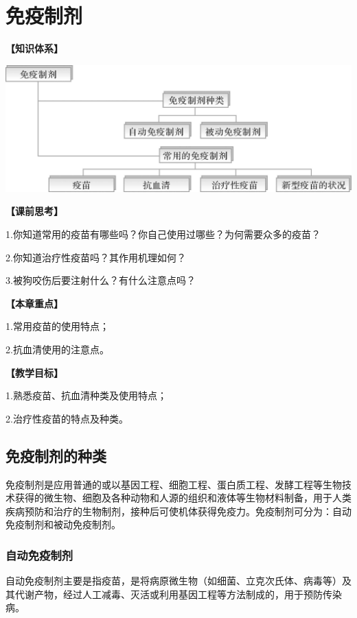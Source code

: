 \chapter{免疫制剂}

\begin{framed}
\noindent\textbf{【知识体系】}
\begin{center}
\includegraphics{./images/Image00185.jpg}
\end{center}
\noindent\textbf{【课前思考】}

1.你知道常用的疫苗有哪些吗？你自己使用过哪些？为何需要众多的疫苗？

2.你知道治疗性疫苗吗？其作用机理如何？

3.被狗咬伤后要注射什么？有什么注意点吗？

\noindent\textbf{【本章重点】}

1.常用疫苗的使用特点；

2.抗血清使用的注意点。

\noindent\textbf{【教学目标】}

1.熟悉疫苗、抗血清种类及使用特点；

2.治疗性疫苗的特点及种类。
\end{framed}

\section{免疫制剂的种类}

免疫制剂是应用普通的或以基因工程、细胞工程、蛋白质工程、发酵工程等生物技术获得的微生物、细胞及各种动物和人源的组织和液体等生物材料制备，用于人类疾病预防和治疗的生物制剂，接种后可使机体获得免疫力。免疫制剂可分为：自动免疫制剂和被动免疫制剂。


\subsection{自动免疫制剂}

自动免疫制剂主要是指疫苗，是将病原微生物（如细菌、立克次氏体、病毒等）及其代谢产物，经过人工减毒、灭活或利用基因工程等方法制成的，用于预防传染病。

